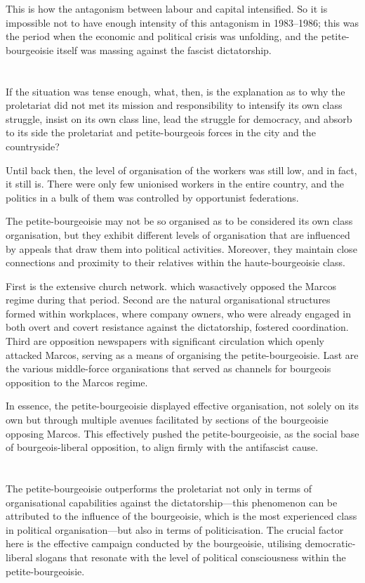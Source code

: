 \documentclass[a4paper,11pt,onesided]{report}
\begin{document}
This is how the antagonism between labour and capital intensified. 
So it is impossible not to have enough 
intensity of this antagonism in 1983--1986;
this was the period when the economic and political crisis was unfolding,
and the petite-bourgeoisie itself was massing against the fascist dictatorship.

\section{}
If the situation was tense enough, 
what, then, is the explanation as to 
why the proletariat did not met its mission and responsibility 
to intensify its own class struggle, 
insist on its own class line, 
lead the struggle for democracy, 
and absorb to its side 
the proletariat and petite-bourgeois forces 
in the city and the countryside?

Until back then, 
the level of organisation of the workers was still low, 
and in fact, it still is. 
There were only few unionised workers in the entire country,
and the politics in a bulk of them was controlled by opportunist federations.

The petite-bourgeoisie may not be so organised 
as to be considered its own class organisation,
but they exhibit different levels of organisation 
that are influenced by appeals 
that draw them into political activities. 
Moreover, 
they maintain close connections and proximity 
to their relatives within the haute-bourgeoisie class.

First is the extensive church network.
which wasactively opposed the Marcos regime during that period. 
Second are the natural organisational structures 
formed within workplaces, 
where company owners, who were already engaged 
in both overt and covert resistance 
against the dictatorship, fostered coordination. 
Third are opposition newspapers 
with significant circulation which openly attacked Marcos, 
serving as a means of organising the petite-bourgeoisie. 
Last are the various middle-force organisations 
that served as channels 
for bourgeois opposition to the Marcos regime.

In essence, 
the petite-bourgeoisie displayed effective organisation, 
not solely on its own 
but through multiple avenues facilitated 
by sections of the bourgeoisie opposing Marcos. 
This effectively pushed the petite-bourgeoisie, 
as the social base of bourgeois-liberal opposition, 
to align firmly with the antifascist cause.


\section{}
The petite-bourgeoisie outperforms the proletariat 
not only in terms of organisational capabilities 
against the dictatorship---this 
phenomenon can be attributed 
to the influence of the bourgeoisie, 
which is the most experienced class in political organisation---but 
also in terms of politicisation. 
The crucial factor here 
is the effective campaign conducted by the bourgeoisie, 
utilising democratic-liberal slogans 
that resonate with the level of political consciousness 
within the petite-bourgeoisie.
\end{document}
